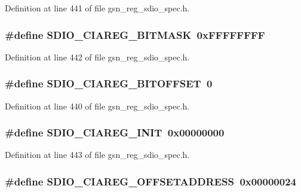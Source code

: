 Definition at line 441 of file gsn\_\-reg\_\-sdio\_\-spec.h.

\hypertarget{a00571_adbc066e2426365ce8a746acfb46973b4}{
\subsubsection[{SDIO\_\-CIAREG\_\-BITMASK}]{\setlength{\rightskip}{0pt plus 5cm}\#define SDIO\_\-CIAREG\_\-BITMASK~0xFFFFFFFF}}
\label{a00571_adbc066e2426365ce8a746acfb46973b4}


Definition at line 442 of file gsn\_\-reg\_\-sdio\_\-spec.h.

\hypertarget{a00571_aa881a66a1e9bbd714fafcd0835219cd9}{
\subsubsection[{SDIO\_\-CIAREG\_\-BITOFFSET}]{\setlength{\rightskip}{0pt plus 5cm}\#define SDIO\_\-CIAREG\_\-BITOFFSET~0}}
\label{a00571_aa881a66a1e9bbd714fafcd0835219cd9}


Definition at line 440 of file gsn\_\-reg\_\-sdio\_\-spec.h.

\hypertarget{a00571_a22ba756dfd7643e4d2ee3474eece83cd}{
\subsubsection[{SDIO\_\-CIAREG\_\-INIT}]{\setlength{\rightskip}{0pt plus 5cm}\#define SDIO\_\-CIAREG\_\-INIT~0x00000000}}
\label{a00571_a22ba756dfd7643e4d2ee3474eece83cd}


Definition at line 443 of file gsn\_\-reg\_\-sdio\_\-spec.h.

\hypertarget{a00571_a2d02db12efc691fbbf778669adc4a601}{
\subsubsection[{SDIO\_\-CIAREG\_\-OFFSETADDRESS}]{\setlength{\rightskip}{0pt plus 5cm}\#define SDIO\_\-CIAREG\_\-OFFSETADDRESS~0x00000024}}
\label{a00571_a2d02db12efc691fbbf778669adc4a601}


